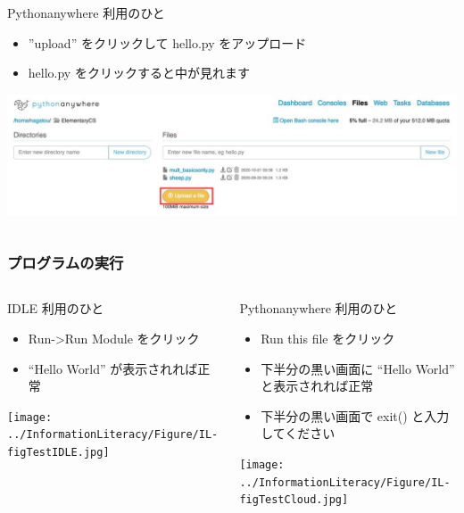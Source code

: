 \begin{frame}
\begin{columns}[t]
\begin{column}{0.5\textwidth}
\begin{itembox}{\footnotesize Pythonanywhere 利用のひと}
\begin{itemize}
\item ''upload'' をクリックして hello.py をアップロード
\item hello.py をクリックすると中が見れます
        \end{itemize}
\includegraphics[width=1\textwidth]{./Figure/elementaryCS-figUpload.jpg}
      \end{itembox}
    \end{column}
  \end{columns}
\end{frame}
\begin{frame}
\frametitle{プログラムの実行}
  \begin{columns}[t]
    \begin{column}{0.5\textwidth}
      \begin{itembox}{\footnotesize IDLE 利用のひと}
        \begin{itemize}
\scriptsize
\item Run->Run Module をクリック
\item ``Hello World'' が表示されれば正常
        \end{itemize}
\texttt{[image: ../InformationLiteracy/Figure/IL-figTestIDLE.jpg]}
      \end{itembox}
    \end{column}
    \begin{column}{0.5\textwidth}
      \begin{itembox}{\footnotesize Pythonanywhere 利用のひと}
\scriptsize
        \begin{itemize}
\item Run this file をクリック
\item 下半分の黒い画面に ``Hello World'' と表示されれば正常
\item 下半分の黒い画面で exit() と入力してください
        \end{itemize}
\texttt{[image: ../InformationLiteracy/Figure/IL-figTestCloud.jpg]}
      \end{itembox}
    \end{column}
  \end{columns}
\end{frame}
